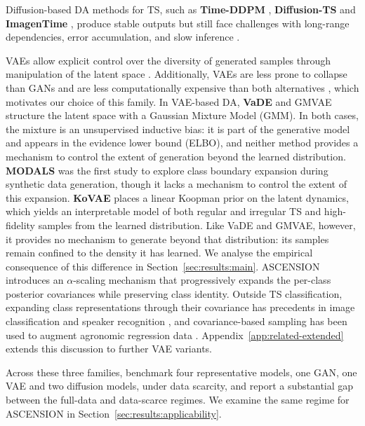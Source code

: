 Diffusion-based DA methods for TS, such as
\textbf{Time-DDPM} \citep{dai2023timeddpm}, \textbf{Diffusion-TS}
\citep{yuandiffusion} and \textbf{ImagenTime}
\citep{naiman2024utilizing}, produce stable outputs but still face
challenges with long-range dependencies, error accumulation, and slow
inference \citep{feng2024latent}.

VAEs allow explicit control over the
diversity of generated samples through manipulation of the latent
space \citep{cheung2020modals}. Additionally, VAEs are
less prone to collapse than GANs and are less computationally
expensive than both alternatives \citep{thanh2020catastrophic}, which
motivates our choice of this family. In VAE-based DA, \textbf{VaDE} \citep{jiang2016variational} and
GMVAE \citep{dilokthanakul2017gmvae} structure the latent
space with a Gaussian Mixture Model (GMM). In both cases, the mixture
is an unsupervised inductive bias: it is part of the generative model
and appears in the evidence lower bound (ELBO), and neither method
provides a mechanism to control the extent of generation beyond the
learned distribution. \textbf{MODALS} \citep{cheung2020modals} was
the first study to explore class boundary expansion during synthetic
data generation, though it lacks a mechanism to control the extent of
this expansion.
\textbf{KoVAE} \citep{naiman2023generative} places a linear
Koopman prior on the latent dynamics, which yields an interpretable
model of both regular and irregular TS and high-fidelity samples
from the learned distribution. Like VaDE and GMVAE, however, it
provides no mechanism to generate beyond that distribution: its
samples remain confined to the density it has learned. We analyse
the empirical consequence of this difference in
Section~\ref{sec:results:main}.
ASCENSION introduces an $\alpha$-scaling mechanism that progressively
expands the per-class posterior covariances while preserving class
identity.
Outside TS classification, expanding class representations through
their covariance has precedents in image classification
\citep{wang2019implicit} and speaker recognition
\citep{wang2020data}, and covariance-based sampling has been used to
augment agronomic regression data \citep{lan2025cotton}.
Appendix~\ref{app:related-extended} extends this discussion to further
VAE variants.

Across these three families, \citet{gonen2025time} benchmark four
representative models, one GAN, one VAE and two diffusion models,
under data scarcity, and report a substantial gap between the
full-data and data-scarce regimes. We examine the same regime for
ASCENSION in Section~\ref{sec:results:applicability}.
